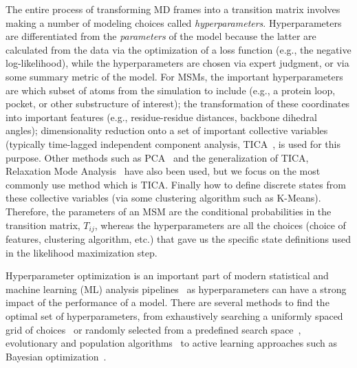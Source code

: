 \documentclass[journal=jacsat,manuscript=article]{achemso}
\begin{document}
The entire process of transforming MD frames into a transition matrix involves making a number of modeling choices called \emph{hyperparameters}. Hyperparameters are differentiated from the \emph{parameters} of the model because the latter are calculated from the data via the optimization of a loss function (e.g., the negative log-likelihood), while the hyperparameters are chosen via expert judgment, or via some summary metric of the model\cite{feurer2019hyperparameter}. 
For MSMs, the important hyperparameters~\cite{Optimized_2016, scherer_variational_2019, husic_markov_2018} are which subset of atoms from the simulation to include (e.g., a protein loop, pocket, or other substructure of interest); the transformation of these coordinates into important features (e.g., residue-residue distances, backbone dihedral angles); dimensionality reduction onto a set of important collective variables (typically time-lagged independent component analysis, TICA~\cite{perez-hernandezIdentificationSlowMolecular2013a}, is used for this purpose. Other methods such as PCA~\cite{nagelSelectingFeaturesMarkov2023} and the generalization of TICA, Relaxation Mode Analysis~\cite{mitsutakeRelaxationModeAnalysis2018} have also been used, but we focus on the most commonly use method which is TICA.  Finally how to define discrete states from these collective variables (via some clustering algorithm such as K-Means). Therefore, the parameters of an MSM are the conditional probabilities in the transition matrix, $T_{ij}$, whereas the hyperparameters are all the choices (choice of features, clustering algorithm, etc.) that gave us the specific state definitions used in the likelihood maximization step.   

Hyperparameter optimization is an important part of modern statistical and machine learning (ML) analysis pipelines~\cite{feurer2019hyperparameter, bergstra_jamesbergstra_random_2012, bergstra_making_2013, bergstraAlgorithmsHyperParameterOptimizationa} as hyperparameters can have a strong impact of the performance of a model. There are several methods to find the optimal set of hyperparameters, from exhaustively searching a uniformly spaced grid of choices~\cite{c1997montgomery} or randomly selected from a predefined search space~\cite{bergstra_jamesbergstra_random_2012}, evolutionary and population algorithms~\cite{simon2013evolutionary, kennedyParticleSwarmOptimization1995, eberhart1998comparison, hansenCMAEvolutionStrategy2016} to active learning approaches such as Bayesian optimization~\cite{hutterSequentialModelbasedOptimization2011, bergstraAlgorithmsHyperParameterOptimizationa, NIPS2012_4522, bergstraMakingScienceModel2013}.
\end{document}
